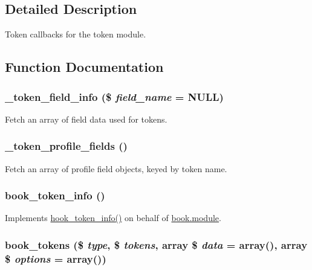 \subsection{Detailed Description}
Token callbacks for the token module. 

\subsection{Function Documentation}
\hypertarget{token_8tokens_8inc_a863ababdc18d92450465ee4a3ebc9f62}{
\subsubsection[{\_\-token\_\-field\_\-info}]{\setlength{\rightskip}{0pt plus 5cm}\_\-token\_\-field\_\-info (\$ {\em field\_\-name} = {\ttfamily NULL})}}
\label{token_8tokens_8inc_a863ababdc18d92450465ee4a3ebc9f62}
Fetch an array of field data used for tokens. \hypertarget{token_8tokens_8inc_ad36240eb20997d7ac4a269acdbab5bc0}{
\subsubsection[{\_\-token\_\-profile\_\-fields}]{\setlength{\rightskip}{0pt plus 5cm}\_\-token\_\-profile\_\-fields ()}}
\label{token_8tokens_8inc_ad36240eb20997d7ac4a269acdbab5bc0}
Fetch an array of profile field objects, keyed by token name. \hypertarget{token_8tokens_8inc_a6499d39402db3d80a41c5791d4deff90}{
\subsubsection[{book\_\-token\_\-info}]{\setlength{\rightskip}{0pt plus 5cm}book\_\-token\_\-info ()}}
\label{token_8tokens_8inc_a6499d39402db3d80a41c5791d4deff90}
Implements \hyperlink{group__hooks_gab868597197cf36911f95dcd29ae0b954}{hook\_\-token\_\-info()} on behalf of \hyperlink{book_8module}{book.module}. \hypertarget{token_8tokens_8inc_a107b610501b0cf966d8b2df90becf740}{
\subsubsection[{book\_\-tokens}]{\setlength{\rightskip}{0pt plus 5cm}book\_\-tokens (\$ {\em type}, \/  \$ {\em tokens}, \/  array \$ {\em data} = {\ttfamily array()}, \/  array \$ {\em options} = {\ttfamily array()})}}
